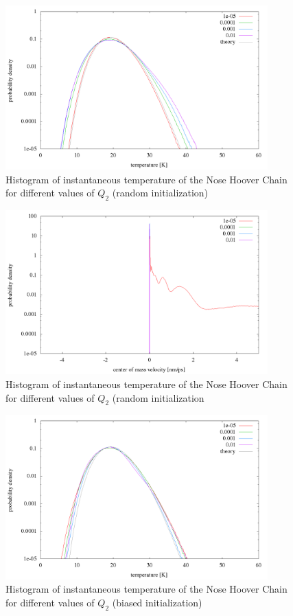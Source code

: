 \begin{figure}[H]
\centering
\includegraphics[width=0.9\textwidth]{./graphics/Histogramm_tempCol_rand_Chain.png}
\caption{Histogram of instantaneous temperature of the Nose Hoover Chain for different values of $Q_2$ (random initialization)}
\label{im:temp_chain_rand}
\end{figure}


\begin{figure}[H]
\centering
\includegraphics[width=0.9\textwidth]{./graphics/Histogramm_schwerVel_one_Chain.png}
\caption{Histogram of instantaneous temperature of the Nose Hoover Chain for different values of $Q_2$ (random initialization}
\label{im:vel_chain_rand}
\end{figure}

\begin{figure}[H]
\centering
\includegraphics[width=0.9\textwidth]{./graphics/Histogramm_tempCol_one_Chain.png}
\caption{Histogram of instantaneous temperature of the Nose Hoover Chain for different values of $Q_2$ (biased initialization)}
\label{im:temp_chain_one}
\end{figure}
